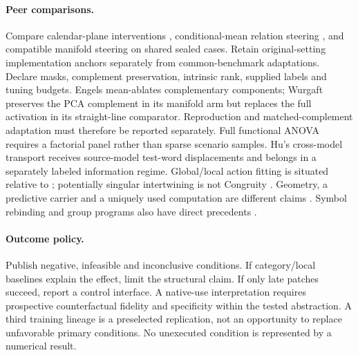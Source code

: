 \paragraph{Peer comparisons.}
Compare calendar-plane interventions \citep{engels2025notall}, conditional-mean relation steering \citep{arora2026causal}, and compatible manifold steering \citep{wurgaft2026manifold} on shared sealed cases. Retain original-setting implementation anchors separately from common-benchmark adaptations. Declare masks, complement preservation, intrinsic rank, supplied labels and tuning budgets. Engels mean-ablates complementary components; Wurgaft preserves the PCA complement in its manifold arm but replaces the full activation in its straight-line comparator. Reproduction and matched-complement adaptation must therefore be reported separately. Full functional ANOVA requires a factorial panel rather than sparse scenario samples. Hu's cross-model transport \citep{hu2026language} receives source-model test-word displacements and belongs in a separately labeled information regime. Global/local action fitting is situated relative to \citet{sun2026transformationlaws}; potentially singular intertwining is not Congruity \citep{sun2026tracking}. Geometry, a predictive carrier and a uniquely used computation are different claims \citep{hindupur2026comparison,makelov2024illusion,zhang2024patching}. Symbol rebinding and group programs also have direct precedents \citep{todd2026algebra}.

\paragraph{Outcome policy.}
Publish negative, infeasible and inconclusive conditions. If category/local baselines explain the effect, limit the structural claim. If only late patches succeed, report a control interface. A native-use interpretation requires prospective counterfactual fidelity and specificity within the tested abstraction. A third training lineage is a preselected replication, not an opportunity to replace unfavorable primary conditions. No unexecuted condition is represented by a numerical result.

